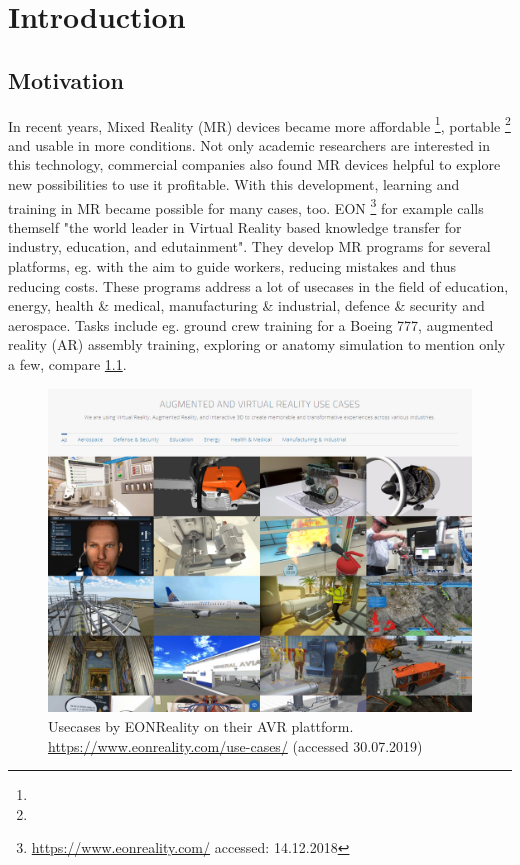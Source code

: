 \chapter{Introduction}

\section{Motivation}
In recent years, Mixed Reality (MR) devices became more affordable \footnote{\todo}, portable \footnote{\todo} and usable in more conditions. Not only academic researchers are interested in this technology, commercial companies also found MR devices helpful to explore new possibilities to use it profitable. With this development, learning and training in MR became possible for many cases, too. EON \footnote{\hyperlink{https://www.eonreality.com/}{https://www.eonreality.com/} accessed: 14.12.2018} for example calls themself "the world leader in Virtual Reality based knowledge transfer for industry, education, and edutainment". They develop MR programs for several platforms, eg. with the aim to guide workers, reducing mistakes and thus reducing costs. These programs address a lot of usecases in the field of education, energy, health \& medical, manufacturing \& industrial, defence \& security and aerospace. Tasks include eg. ground crew training for a Boeing 777, augmented reality (AR) assembly training, exploring or anatomy simulation to mention only a few, compare \ref{fig:eonreality}.
\begin{figure}
	\centering
	\includegraphics[width=1.0\textwidth]{img/eonreality.PNG}
	\caption{Usecases by EONReality on their AVR plattform.  \hyperlink{https://www.eonreality.com/use-cases/}{https://www.eonreality.com/use-cases/} (accessed 30.07.2019)}
	\label{fig:eonreality}
\end{figure}
